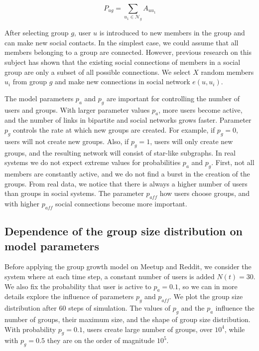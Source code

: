 \begin{equation}
P_{ug}=\sum_{u_{1}\in \mathcal{N}_{g}} A_{uu_{1}} 
\label{eq1}
\end{equation}

After selecting group $g$, user $u$ is introduced to new members in the group and can make new social contacts. In the simplest case, we could assume that all members belonging to a group are connected. However, previous research on this subject \cite{ smiljanic2017associative, backstrom2006group, zheleva2009co} has shown that the existing social connections of members in a social group are only a subset of all possible connections. We select $X$ random members $u_i$ from group $g$ and make new connections in social network $e(u, u_i)$. 

The model parameters $p_a$ and $p_g$ are important for controlling the number of users and groups. With larger parameter values $p_a$, more users become active, and the number of links in bipartite and social networks grows faster. Parameter $p_g$ controls the rate at which new groups are created. For example, if $p_g=0$, users will not create new groups. Also, if $p_g=1$, users will only create new groups, and the resulting network will consist of star-like subgraphs. In real systems we do not expect extreme values for probabilities $p_a$ and $p_g$. First, not all members are constantly active, and we do not find a burst in the creation of the groups. From real data, we notice that there is always a higher number of users than groups in social systems. The parameter $p_{aff}$ how users choose groups, and with higher $p_{aff}$ social connections become more important. 

\subsection{Dependence of the group size distribution on model parameters}

Before applying the group growth model on Meetup and Reddit, we consider the system where at each time step, a constant number of users is added $N(t)=30$. We also fix the probability that user is active to $p_a=0.1$, so we can in more details explore the influence of parameters $p_g$ and $p_{aff}$. We plot the group size distribution after $60$ steps of simulation. The values of $p_g$ and the $p_a$ influence the number of groups, their maximum size, and the shape of group size distribution. With probability $p_g=0.1$, users create large number of groups, over $10^4$, while with $p_g=0.5$ they are on the order of magnitude $10^5$. 

